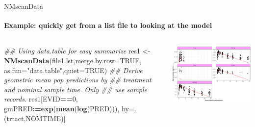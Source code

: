 \documentclass[
  8pt,
  ignorenonframetext,
  aspectratio=169]{beamer}
\newenvironment{Shaded}{\begin{snugshade}}{\end{snugshade}}
\newcommand{\CommentTok}[1]{\textcolor[rgb]{0.56,0.35,0.01}{\textit{#1}}}
\newcommand{\DataTypeTok}[1]{\textcolor[rgb]{0.13,0.29,0.53}{#1}}
\newcommand{\DecValTok}[1]{\textcolor[rgb]{0.00,0.00,0.81}{#1}}
\newcommand{\ErrorTok}[1]{\textcolor[rgb]{0.64,0.00,0.00}{\textbf{#1}}}
\newcommand{\KeywordTok}[1]{\textcolor[rgb]{0.13,0.29,0.53}{\textbf{#1}}}
\newcommand{\NormalTok}[1]{#1}
\newcommand{\OperatorTok}[1]{\textcolor[rgb]{0.81,0.36,0.00}{\textbf{#1}}}
\newcommand{\OtherTok}[1]{\textcolor[rgb]{0.56,0.35,0.01}{#1}}
\newcommand{\StringTok}[1]{\textcolor[rgb]{0.31,0.60,0.02}{#1}}
\begin{document}
\begin{frame}[fragile]{NMscanData}
\protect\hypertarget{nmscandata-1}{}
\framesubtitle{Example: quickly get from a list file to looking at the model}

\footnotesize

\begin{columns}[T]
\begin{column}{0.45\textwidth}
\begin{Shaded}
\begin{Highlighting}[]
\CommentTok{\#\# Using data.table for easy summarize}
\NormalTok{res1 \textless{}{-}}\StringTok{ }\KeywordTok{NMscanData}\NormalTok{(file1.lst,}\DataTypeTok{merge.by.row=}\OtherTok{TRUE}\NormalTok{,}
                   \DataTypeTok{as.fun=}\StringTok{"data.table"}\NormalTok{,}\DataTypeTok{quiet=}\OtherTok{TRUE}\NormalTok{)}
\CommentTok{\#\# Derive geometric mean pop predictions by}
\CommentTok{\#\# treatment and nominal sample time. Only}
\CommentTok{\#\# use sample records.}
\NormalTok{res1[EVID}\OperatorTok{==}\DecValTok{0}\NormalTok{,}
\NormalTok{     gmPRED}\OperatorTok{:}\ErrorTok{=}\KeywordTok{exp}\NormalTok{(}\KeywordTok{mean}\NormalTok{(}\KeywordTok{log}\NormalTok{(PRED))),}
\NormalTok{     by=.(trtact,NOMTIME)]}
\end{Highlighting}
\end{Shaded}
\end{column}

\begin{column}{0.55\textwidth}
\normalsize

\begin{center}\includegraphics[width=1.05\linewidth]{plots/aplot-plot-1} \end{center}
\end{column}
\end{columns}
\end{frame}
\end{document}
